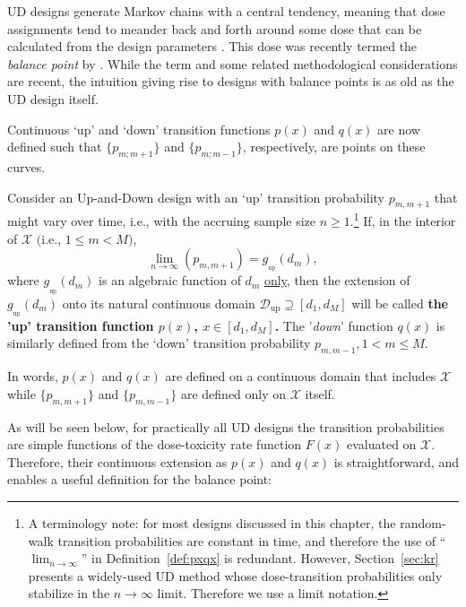 UD designs generate Markov chains with a central tendency, meaning that dose assignments tend to meander back and forth around some dose that can be calculated from the design parameters \citep{Durh:Flou:rand:1994,Hugh:Rand:1995}. This dose was recently termed the \emph{balance point} by \cite{Oron:Hoff:thek:2009}. While the term and some related methodological considerations are recent, the intuition giving rise to designs with balance points is as old as the UD design itself.

Continuous `up' and `down' transition functions $p(x)$ and $q(x)$ are now defined such that
$\{p_{m;m+1}\}$ and $\{p_{m;m-1}\}$, respectively, are points on these curves.

\begin{defn}\label{def:pxqx}
Consider an Up-and-Down design with an `up' transition probability  $p_{m,m+1}$ that might vary over time, i.e., with the accruing sample size $n\geq 1$.\footnote{A terminology note: for most designs discussed in this chapter, the random-walk transition probabilities are constant in time, and therefore the use of ``$\lim_{n\to\infty}$'' in Definition~\ref{def:pxqx} is redundant. However, Section~\ref{sec:kr} presents a widely-used UD method whose dose-transition probabilities only stabilize in the $n\to\infty$ limit. Therefore we use a limit notation.} If, in the interior of $\mathcal{X}$ $($i.e., $1\leq m<M)$, $$\lim_{n\to\infty}\left(p_{m,m+1}\right)=g_{_\mathrm{up}}\left(d_m\right),$$
where $g_{_\mathrm{up}}\left(d_m\right)$ is an algebraic function of $d_m$  \underline{only}, then the extension of $g_{_\mathrm{up}}\left(d_m\right)$ onto its natural continuous domain $\mathcal{D}{_\mathrm{up}}\supseteq\left[d_1,d_M\right]$ will be called \textbf{the 'up' transition function $p(x)$, $x\in\left[d_1,d_M\right]$.} The '\emph{down}' function $q(x)$ is similarly defined from the `down' transition probability $p_{m,m-1}, 1<m\leq M$.
\end{defn}

In words, $p(x)$ and $q(x)$ are defined on a continuous domain that includes $\mathcal{X}$ while $\{p_{m,m+1}\}$ and $\{p_{m,m-1}\}$ are defined only on $\mathcal{X}$ itself.

As will be seen below, for practically all UD designs the transition probabilities are simple functions of the dose-toxicity rate function $F(x)$ evaluated on $\mathcal{X}$. Therefore, their continuous extension as $p(x)$ and $q(x)$ is straightforward, and enables a useful definition for the balance point:

